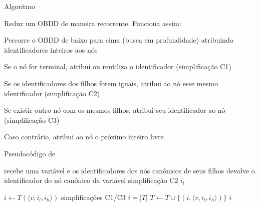 \expandafter\documentclass\expandafter[table, usenames, svgnames, dvipsnames,14pt, \classopts]{beamer}
\begin{document}
\begin{frame}{Algoritmo }

    \small
    Reduz um OBDD de maneira recorrente. Funciona assim:
    
    \begin{outline}[enumerate]
        \1 Percorre o OBDD de baixo para cima (busca em profundidade) atribuindo identificadores inteiros aos nós
        
        \1 Se o nó for terminal, atribui ou reutiliza o identificador (simplificação C1)
        
        \1 Se os identificadores dos filhos forem iguais, atribui ao nó esse mesmo identificador (simplificação C2)
        
        \1 Se existir outro nó com os mesmos filhos, atribui seu identificador ao nó (simplificação C3)
        
        \1 Caso contrário, atribui ao nó o próximo inteiro livre
        
    \end{outline}

\end{frame}

\begin{frame}{Pseudocódigo de }
    \begin{algorithm}[H]
        \scriptsize
        \begin{algorithmic}[1]
            \Require recebe uma variável e os identificadores dos nós canônicos de seus filhos
            \Ensure devolve o identificador do nó canônico da variável
                     \Comment simplificação C2
                        \State \Return $i_l$
                    \EndIf
                \EndIf
            
                \State $i \gets T(\langle v,i_l,i_h \rangle)$
                 \Comment simplificações C1/C3
                    \State $i = |T|$
                    \State $T \gets T \cup \{(i, \langle v,i_l,i_h \rangle)\}$
                \EndIf
                \State \Return $i$
            \EndFunction
        \end{algorithmic}
    \end{algorithm}

\end{frame}
\end{document}
